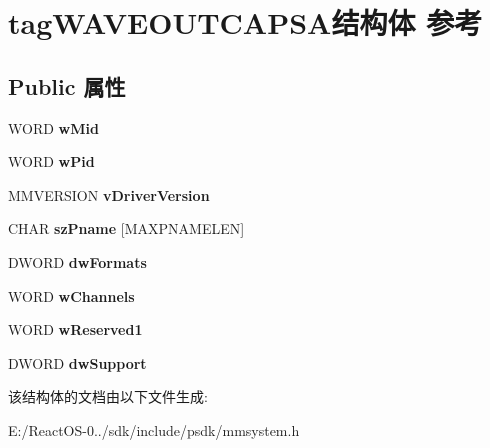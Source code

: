 \hypertarget{structtag_w_a_v_e_o_u_t_c_a_p_s_a}{}\section{tag\+W\+A\+V\+E\+O\+U\+T\+C\+A\+P\+S\+A结构体 参考}
\label{structtag_w_a_v_e_o_u_t_c_a_p_s_a}
\subsection*{Public 属性}
\begin{DoxyCompactItemize}
\item 
\mbox{\label{structtag_w_a_v_e_o_u_t_c_a_p_s_a_a66262cec2d0609157ed4b8cd62578843}} 
W\+O\+RD {\bfseries w\+Mid}
\item 
\mbox{\label{structtag_w_a_v_e_o_u_t_c_a_p_s_a_afefbf61b1407a56b0e7dd8f4e2850feb}} 
W\+O\+RD {\bfseries w\+Pid}
\item 
\mbox{\label{structtag_w_a_v_e_o_u_t_c_a_p_s_a_aa4e20f03be6316cb0f9bff56346822b2}} 
M\+M\+V\+E\+R\+S\+I\+ON {\bfseries v\+Driver\+Version}
\item 
\mbox{\label{structtag_w_a_v_e_o_u_t_c_a_p_s_a_a3c3bfaaab777ed351b16abf032295ce7}} 
C\+H\+AR {\bfseries sz\+Pname} \mbox{[}M\+A\+X\+P\+N\+A\+M\+E\+L\+EN\mbox{]}
\item 
\mbox{\label{structtag_w_a_v_e_o_u_t_c_a_p_s_a_a02c5882b036deff2981d9423152cd9c1}} 
D\+W\+O\+RD {\bfseries dw\+Formats}
\item 
\mbox{\label{structtag_w_a_v_e_o_u_t_c_a_p_s_a_aab6048056d625c24825add8101dff7c2}} 
W\+O\+RD {\bfseries w\+Channels}
\item 
\mbox{\label{structtag_w_a_v_e_o_u_t_c_a_p_s_a_a81806aa611276782d5fbfb77547563bd}} 
W\+O\+RD {\bfseries w\+Reserved1}
\item 
\mbox{\label{structtag_w_a_v_e_o_u_t_c_a_p_s_a_a118e268a996861817fd04086a8afb872}} 
D\+W\+O\+RD {\bfseries dw\+Support}
\end{DoxyCompactItemize}


该结构体的文档由以下文件生成\+:\begin{DoxyCompactItemize}
\item 
E\+:/\+React\+O\+S-\/0../sdk/include/psdk/mmsystem.\+h\end{DoxyCompactItemize}
